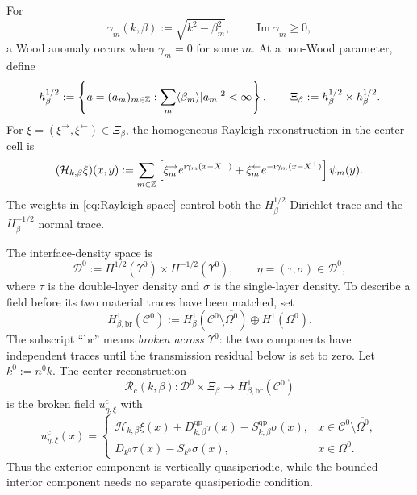 For
\[
  \gamma_m(k,\beta):=\sqrt{k^2-\beta_m^2},
  \qquad \operatorname{Im}\gamma_m\geq0,
\]
a Wood anomaly occurs when $\gamma_m=0$ for some $m$.  At a non-Wood
parameter, define
\begin{equation}
  h^{1/2}_\beta:=
  \left\{a=(a_m)_{m\in\mathbb{Z}}:
  \sum_m\langle\beta_m\rangle|a_m|^2<\infty\right\},
  \qquad
  \Xi_\beta:=h^{1/2}_\beta\times h^{1/2}_\beta.
  \label{eq:Rayleigh-space}
\end{equation}
For $\xi=(\xi^\rightarrow,\xi^\leftarrow)\in\Xi_\beta$, the homogeneous
Rayleigh reconstruction in the center cell is
\begin{equation}
  (\mathcal H_{k,\beta}\xi)(x,y)
  :=\sum_{m\in\mathbb{Z}}\left[
  \xi_m^\rightarrow e^{\mathrm{i}\gamma_m(x-X^-)}
  +\xi_m^\leftarrow e^{-\mathrm{i}\gamma_m(x-X^+)}\right]\psi_m(y).
  \label{eq:Rayleigh-reconstruction}
\end{equation}
The weights in \eqref{eq:Rayleigh-space} control both the
$H^{1/2}_\beta$ Dirichlet trace and the $H^{-1/2}_\beta$ normal trace.

The interface-density space is
\begin{equation}
  \mathcal D^0:=H^{1/2}(\Upsilon^0)\times H^{-1/2}(\Upsilon^0),
  \qquad \eta=(\tau,\sigma)\in\mathcal D^0,
  \label{eq:density-space}
\end{equation}
where $\tau$ is the double-layer density and $\sigma$ is the single-layer
density.  To describe a field before its two material traces have been
matched, set
\begin{equation}
  H^1_{\beta,\mathrm{br}}(\mathcal C^0):=
  H^1_\beta(\mathcal C^0\setminus\overline{\Omega^0})
  \oplus H^1(\Omega^0).
  \label{eq:center-broken-space}
\end{equation}
The subscript ``br'' means \emph{broken across $\Upsilon^0$}: the two components
have independent traces until the transmission residual below is set to zero.
Let $k^0:=n^0k$.  The center reconstruction
\begin{equation}
  \mathcal R_{\mathrm c}(k,\beta):\mathcal D^0\times\Xi_\beta
  \longrightarrow H^1_{\beta,\mathrm{br}}(\mathcal C^0)
  \label{eq:center-reconstruction-map}
\end{equation}
is the broken field $u_{\eta,\xi}^{\mathrm c}$ with
\begin{equation}
  u_{\eta,\xi}^{\mathrm c}(x)=
  \begin{cases}
  \mathcal H_{k,\beta}\xi(x)
  +D^{\mathrm{qp}}_{k,\beta}\tau(x)
  -S^{\mathrm{qp}}_{k,\beta}\sigma(x),
  &x\in\mathcal C^0\setminus\overline{\Omega^0},\\
  D_{k^0}\tau(x)-S_{k^0}\sigma(x),
  &x\in\Omega^0.
  \end{cases}
  \label{eq:center-reconstruction}
\end{equation}
Thus the exterior component is vertically quasiperiodic, while the bounded
interior component needs no separate quasiperiodic condition.

